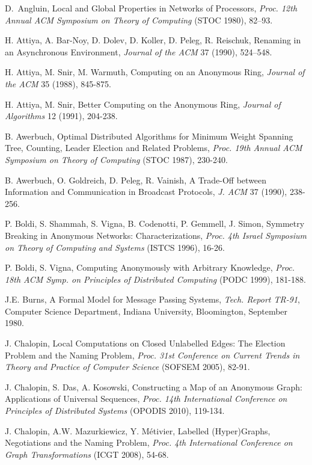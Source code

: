 \documentclass[a4paper,10pt]{article}
\begin{document}

\begin{thebibliography}{99}

D.~Angluin, Local and Global Properties in Networks of Processors,
{\em Proc. 12th Annual ACM Symposium on Theory of Computing} (STOC 1980), 82--93.

H. Attiya, A. Bar-Noy, D. Dolev, D. Koller, D. Peleg, R. Reischuk,
Renaming in an Asynchronous Environment, {\em Journal of the ACM} 37 (1990), 524--548.

H. Attiya, M. Snir, M. Warmuth,
Computing on an Anonymous Ring,
{\em Journal of the ACM} 35 (1988), 845-875.

H. Attiya, M. Snir,
Better Computing on the Anonymous Ring,
{\em Journal of Algorithms} 12 (1991), 204-238.

B. Awerbuch, Optimal Distributed Algorithms for Minimum Weight Spanning Tree, 
Counting, Leader Election and Related Problems,
{\em Proc. 19th Annual ACM Symposium on Theory of Computing} (STOC 1987), 230-240.

B. Awerbuch, O. Goldreich, D. Peleg, R. Vainish,
A Trade-Off between Information and Communication in Broadcast Protocols,
{\em J. {ACM}} 37 (1990), 238-256.

P. Boldi, S. Shammah, S. Vigna, B. Codenotti, P. Gemmell, J. Simon,
Symmetry Breaking in Anonymous Networks: Characterizations,
{\em Proc. 4th Israel Symposium on Theory of Computing and Systems} (ISTCS 1996), 16-26.

P. Boldi, S. Vigna,
Computing Anonymously with Arbitrary Knowledge,
{\em Proc. 18th ACM Symp. on Principles of Distributed Computing} (PODC 1999), 181-188.

J.E. Burns, A Formal Model for Message Passing Systems,
{\em Tech. Report TR-91}, Computer Science Department,
Indiana University, Bloomington, September 1980.

J. Chalopin,
Local Computations on Closed Unlabelled Edges: The Election Problem and the Naming Problem,
{\em Proc. 31st Conference on Current Trends in Theory and Practice of Computer Science} (SOFSEM 2005), 82-91.

J. Chalopin, S. Das, A. Kosowski, 
Constructing a Map of an Anonymous Graph: Applications of Universal Sequences,
{\em Proc. 14th International Conference on Principles of Distributed Systems} (OPODIS 2010), 119-134.

J. Chalopin, A.W. Mazurkiewicz, Y. M\'etivier, Labelled (Hyper)Graphs, Negotiations and the Naming Problem,
{\em Proc. 4th International Conference on Graph Transformations} (ICGT 2008), 54-68.


\end{thebibliography}
\end{document}
